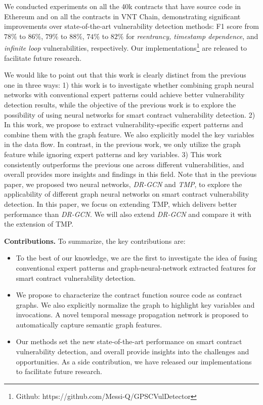 We conducted experiments on all the 40k contracts that have source code in Ethereum and on all the contracts in VNT Chain, demonstrating significant improvements over state-of-the-art vulnerability detection methods: F1 score from $78\%$ to $86\%$, $79\%$ to $88\%$, $74\%$ to $82\%$ for \emph{reentrancy, timestamp dependence}, and \emph{infinite loop} vulnerabilities, respectively. Our implementations\footnote{Github: https://github.com/Messi-Q/GPSCVulDetector} are released to facilitate future research.

We would like to point out that this work is clearly distinct from the previous one \cite{ijcai} in three ways: 1) this work is to investigate whether combining graph neural networks with conventional expert patterns could achieve better vulnerability detection results, while the objective of the previous work is to explore the possibility of using neural networks for smart contract vulnerability detection. 2) In this work, we propose to extract vulnerability-specific expert patterns and combine them with the graph feature. We also explicitly model the key variables in the data flow. In contrast, in the previous work, we only utilize the graph feature while ignoring expert patterns and key variables. 3) This work consistently outperforms the previous one across different vulnerabilities, and overall provides more insights and findings in this field. Note that in the previous paper, we proposed two neural networks, \emph{DR-GCN} and \emph{TMP}, to explore the applicability of different graph neural networks on smart contract vulnerability detection. In this paper, we focus on extending TMP, which delivers better performance than \emph{DR-GCN}. We will also extend \emph{DR-GCN} and compare it with the extension of TMP. 
 
\textbf{Contributions.} To summarize, the key contributions are: 

\begin{itemize} 
\item
To the best of our knowledge, we are the first to investigate the idea of fusing conventional expert patterns and graph-neural-network extracted features for smart contract vulnerability detection. 
\item We propose to characterize the contract function source code as contract graphs. We also explicitly normalize the graph to highlight key variables and invocations. A novel temporal message propagation network is proposed to automatically capture semantic graph features.  
\item Our methods set the new state-of-the-art performance on smart contract vulnerability detection, and overall provide insights into the challenges and opportunities. As a side contribution, we have released our implementations to facilitate future research.
\end{itemize}

